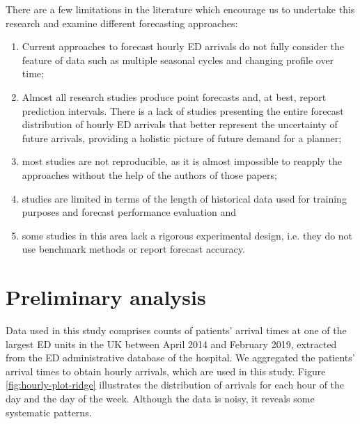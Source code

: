 \documentclass[]{elsarticle} %
\providecommand{\tightlist}{%
  \setlength{\itemsep}{0pt}\setlength{\parskip}{0pt}}
\begin{document}
There are a few limitations in the literature which encourage us to
undertake this research and examine different forecasting approaches:

\begin{enumerate}
\def\labelenumi{(\roman{enumi})}
\tightlist
\item
  Current approaches to forecast hourly ED arrivals do not fully
  consider the feature of data such as multiple seasonal cycles and
  changing profile over time;
\item
  Almost all research studies produce point forecasts and, at best,
  report prediction intervals. There is a lack of studies presenting
  the entire forecast distribution of hourly ED arrivals that better
  represent the uncertainty of future arrivals, providing a holistic
  picture of future demand for a planner;
\item
  most studies are not reproducible, as it is almost impossible to
  reapply the approaches without the help of the authors of those
  papers;
\item
  studies are limited in terms of the length of historical data used
  for training purposes and forecast performance evaluation and
\item
  some studies in this area lack a rigorous experimental design, i.e.
  they do not use benchmark methods or report forecast accuracy.
\end{enumerate}

\hypertarget{data}{%
\section{Preliminary analysis}\label{data}}

Data used in this study comprises counts of patients' arrival times at
one of the largest ED units in the UK between April 2014 and February
2019, extracted from the ED administrative database of the hospital. We
aggregated the patients' arrival times to obtain hourly arrivals, which
are used in this study. Figure \ref{fig:hourly-plot-ridge} illustrates
the distribution of arrivals for each hour of the day and the day of the
week. Although the data is noisy, it reveals some systematic patterns.
\end{document}
